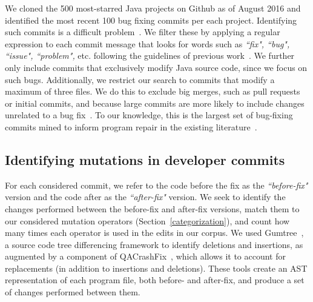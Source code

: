\documentclass[conference]{IEEEtran}
\begin{document}
We cloned the 500 most-starred Java projects on Github 
as of August 2016 and
identified the most recent 100 bug fixing commits per each project. Identifying
such commits is a difficult
problem~\cite{Bird09}. We filter these by applying a
regular expression to each commit message that looks for words such as \emph{``fix", ``bug", ``issue", ``problem",}
etc. following the guidelines of previous work~\cite{schroter06}.
%
We further only include commits
that exclusively 
modify Java source code, since we focus on such bugs. Additionally, we restrict our search to commits 
that modify a maximum of three files. We do this to exclude
big merges, such as pull requests or initial commits, and because
large commits are more likely to include changes unrelated to a bug fix~\cite{Herzig13,Kawrykow11}.
To our knowledge, this is the largest set of bug-fixing commits mined to inform
program repair in the existing literature~\cite{long16proph,Soto16,zhong15,martinez15,xuan16}. 

\subsection{Identifying mutations in developer commits}
\label{sec:mining}

For each considered commit, we refer to the code before the fix as the
\emph{``before-fix"} version and the code after as the \emph{``after-fix"} version.
We seek to identify the changes performed between the before-fix and
after-fix versions, match them to our considered mutation operators
(Section~\ref{categorization}), and count how many times each operator is used
in the edits in our corpus. 
We used Gumtree~\cite{falleri14}, a source code tree
differencing framework to identify deletions and insertions, as augmented by a
component of QACrashFix~\cite{gao15}, which allows it to account for
replacements (in addition to insertions and deletions).
These tools create an AST representation of each program file, both before- and after-fix, and produce a set of 
changes performed between them. 
\end{document}
